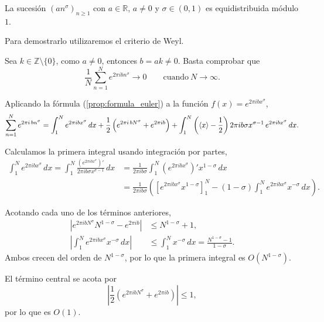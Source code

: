 \begin{example}
    La sucesión $(an^\sigma)_{n\geq1}$ con $a \in \mathbb{R}$, $a \neq 0$ y 
    $\sigma \in (0,1)$ es equidistribuida módulo $1$.
\end{example}

\begin{resolve}    
    Para demostrarlo utilizaremos el criterio de Weyl. 

    Sea $k \in \mathbb{Z}\setminus\{0\}$, como $a \neq 0$, entonces $b = ak \neq 0$. 
    Basta comprobar que 
    \[
        \frac{1}{N} \sum_{n=1}^N e^{2\pi i b n^\sigma} \longrightarrow 0 
        \qquad \text{cuando} \ N \to \infty.
    \]

    Aplicando la fórmula (\ref{prop:formula_euler}) a la función $f(x) = e^{2\pi i b x^\sigma}$,
    \[
        \sum_{n=1}^N e^{2\pi i \, b n^\sigma}
        = \int_1^N e^{2\pi i b x^\sigma} \, dx 
        + \frac{1}{2} \left(e^{2\pi i \, b N^\sigma} + e^{2\pi i b}\right)
        + \int_1^N \left(\langle x \rangle - \frac{1}{2}\right) 2\pi i b \sigma x^{\sigma-1} \, e^{2\pi i b x^\sigma} \, dx .
    \]

    Calculamos la primera integral usando integración por partes,
    \begin{align*}
        \int_1^N e^{2\pi i b x^\sigma} \, dx 
        = \int_1^N \frac{\left(e^{2\pi i b x^\sigma}\right)'}{2\pi i b \sigma x^{\sigma-1}} \, dx
        &= \frac{1}{2 \pi i b \sigma} \int_1^N \left(e^{2\pi i b x^\sigma}\right)'x^{1-\sigma} \, dx \\
        &= \frac{1}{2 \pi i b \sigma} \left(\left[e^{2\pi i b x^\sigma}x^{1-\sigma}\right]_1^N - (1-\sigma) \int_1^N e^{2\pi i b x^\sigma} x^{-\sigma} \, dx \right).
    \end{align*}  
    
    Acotando cada uno de los términos anteriores,
    \begin{align*}
        \left| e^{2\pi i b N^\sigma}N^{1-\sigma} - e^{2\pi i b}\right|
        &\leq N^{1-\sigma} + 1, \\
        \left|\int_1^N e^{2\pi i b x^\sigma} x^{-\sigma} \, dx\right|
        &\leq \int_1^N x^{-\sigma} \, dx
        = \frac{N^{1-\sigma} - 1}{1-\sigma}.
    \end{align*}
    Ambos crecen del orden de $N^{1-\sigma}$, por lo que la primera integral es $O(N^{1-\sigma})$.

    El término central se acota por
    \[
        \left|\frac{1}{2} \left(e^{2\pi i b N^\sigma} + e^{2\pi i b}\right)\right| \leq 1,
    \]
    por lo que es $O(1)$.


\end{resolve}

